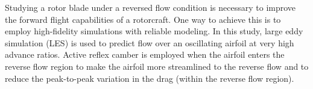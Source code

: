 Studying a rotor blade under a reversed flow condition
is necessary to improve the forward flight capabilities of a rotorcraft.
One way to achieve this is to employ high-fidelity simulations with reliable modeling.
In this study, large eddy simulation (LES) is used to predict flow over an oscillating airfoil at very high advance ratios. 
Active reflex camber is employed when the airfoil enters
the reverse flow region to make the airfoil more streamlined to the reverse flow and to reduce
the peak-to-peak variation in the drag (within the reverse flow region).



